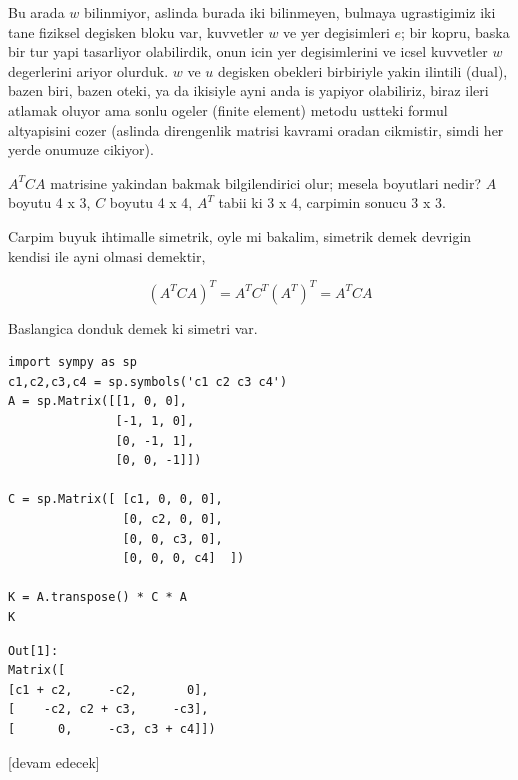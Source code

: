 \documentclass[12pt,fleqn]{article}\usepackage{../../common}
\begin{document}
Bu arada $w$ bilinmiyor, aslinda burada iki bilinmeyen, bulmaya ugrastigimiz iki
tane fiziksel degisken bloku var, kuvvetler $w$ ve yer degisimleri $e$; bir
kopru, baska bir tur yapi tasarliyor olabilirdik, onun icin yer degisimlerini ve
icsel kuvvetler $w$ degerlerini ariyor olurduk. $w$ ve $u$ degisken obekleri
birbiriyle yakin ilintili (dual), bazen biri, bazen oteki, ya da ikisiyle ayni
anda is yapiyor olabiliriz, biraz ileri atlamak oluyor ama sonlu ogeler (finite
element) metodu ustteki formul altyapisini cozer (aslinda direngenlik matrisi
kavrami oradan cikmistir, simdi her yerde onumuze cikiyor).

$A^T C A$ matrisine yakindan bakmak bilgilendirici olur; mesela boyutlari nedir?
$A$ boyutu 4 x 3, $C$ boyutu 4 x 4, $A^T$ tabii ki 3 x 4, carpimin sonucu 3 x 3.

Carpim buyuk ihtimalle simetrik, oyle mi bakalim, simetrik demek devrigin
kendisi ile ayni olmasi demektir, 

$$
(A^T C A)^T = A^T C^T (A^T)^T = A^T C A 
$$

Baslangica donduk demek ki simetri var.

\begin{verbatim}
import sympy as sp
c1,c2,c3,c4 = sp.symbols('c1 c2 c3 c4')
A = sp.Matrix([[1, 0, 0],
               [-1, 1, 0],
               [0, -1, 1],
               [0, 0, -1]])

C = sp.Matrix([ [c1, 0, 0, 0],
                [0, c2, 0, 0],
                [0, 0, c3, 0],
                [0, 0, 0, c4]  ])

K = A.transpose() * C * A
K
\end{verbatim}

\begin{verbatim}
Out[1]: 
Matrix([
[c1 + c2,     -c2,       0],
[    -c2, c2 + c3,     -c3],
[      0,     -c3, c3 + c4]])
\end{verbatim}





















[devam edecek]
\end{document}
